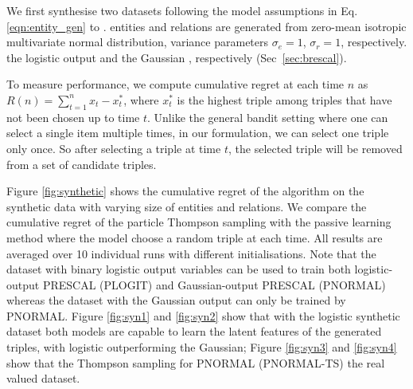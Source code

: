 We first synthesise two datasets 
following the model assumptions in Eq. \ref{eqn:entity_gen} to 
\verify{\ref{eqn:triple_gen}}. 
entities and relations are generated from zero-mean isotropic multivariate normal distribution,  
variance parameters $\sigma_e=1$, $\sigma_r=1$, respectively.
 the logistic output and the Gaussian , respectively (Sec~\ref{sec:brescal}). 

To measure performance, we compute cumulative regret 
at each time $n$ as $R(n) = \sum_{t=1}^{n} x_t - x^{*}_t$, 
where $x^*_t$ is the highest triple among triples that have not been chosen up to time $t$. Unlike the general 
bandit setting where one can select a single item multiple times, in our formulation, we can select one triple 
only once. So after selecting a triple at time $t$, the selected triple will be removed from a set of candidate 
triples.

Figure \ref{fig:synthetic} shows the cumulative regret of the algorithm on the synthetic data with varying size of 
entities and relations. We compare the cumulative regret of the particle Thompson sampling with the passive 
learning method where the model choose a random triple at each time. All results are averaged over 10 
individual runs with different initialisations. 
Note that the dataset with binary logistic output variables can be used to train both logistic-output PRESCAL (PLOGIT) and Gaussian-output PRESCAL (PNORMAL) whereas the dataset with the Gaussian output can only be trained by PNORMAL.
Figure \ref{fig:syn1} and \ref{fig:syn2} show that with the logistic synthetic dataset both models are capable to learn the latent features of the generated triples, with logistic outperforming the Gaussian; Figure \ref{fig:syn3} and \ref{fig:syn4} show that the Thompson sampling for PNORMAL (PNORMAL-TS)  the real valued dataset. 

